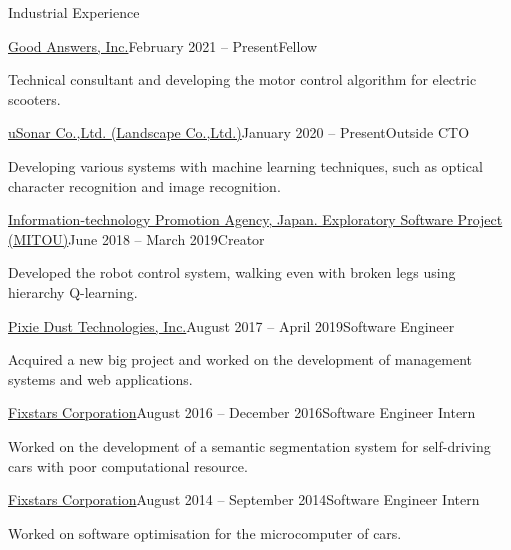 \documentclass{resume} %
\begin{document}
\begin{rSection}{Industrial Experience}

    \begin{rSubsection}{\href{https://info.gbiz.go.jp/hojin/ichiran?hojinBango=2430001082637}{Good Answers, Inc.}}{February 2021 -- Present}{Fellow}{}
    \item Technical consultant and developing the motor control algorithm for electric scooters.
    \end{rSubsection}

    \begin{rSubsection}{\href{https://www.landscape.co.jp/}{uSonar Co.,Ltd. (Landscape Co.,Ltd.)}}{January 2020 -- Present}{Outside CTO}{}
    \item Developing various systems with machine learning techniques, such as optical character recognition and image recognition.
    \end{rSubsection}

    \begin{rSubsection}{\href{https://www.mitou.org/}{Information-technology Promotion Agency, Japan. Exploratory Software Project (MITOU)}}{June 2018 -- March 2019}{Creator}{}
    \item Developed the robot control system, walking even with broken legs using hierarchy Q-learning.
    \end{rSubsection}

    \begin{rSubsection}{\href{http://pixiedusttech.com/}{Pixie Dust Technologies, Inc.}}{August 2017 -- April 2019}{Software Engineer}{}
    \item Acquired a new big project and worked on the development of management systems and web applications.
    \end{rSubsection}

    \begin{rSubsection}{\href{https://www.fixstars.com/en/}{Fixstars Corporation}}{August 2016 -- December 2016}{Software Engineer Intern}{}
    \item Worked on the development of a semantic segmentation system for self-driving cars with poor computational resource.
    \end{rSubsection}

    \begin{rSubsection}{\href{https://www.fixstars.com/en/}{Fixstars Corporation}}{August 2014 -- September 2014}{Software Engineer Intern}{}
    \item Worked on software optimisation for the microcomputer of cars.
    \end{rSubsection}

\end{rSection}
\end{document}
